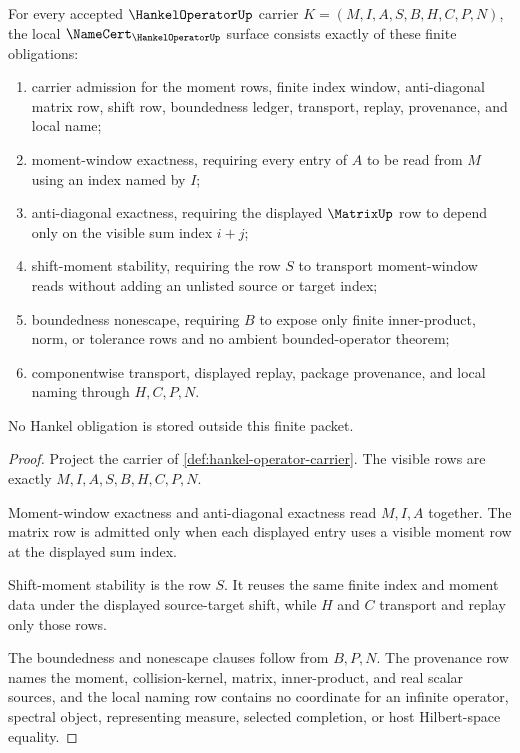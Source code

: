 \begin{theorem}
\label{thm:hankel-operator-namecert-obligations}
For every accepted $\HankelOperatorUp$ carrier $K=(M,I,A,S,B,H,C,P,N)$, the local $\NameCert_{\HankelOperatorUp}$ surface consists exactly of these finite obligations:
\begin{enumerate}
\item carrier admission for the moment rows, finite index window, anti-diagonal matrix row, shift row, boundedness ledger, transport, replay, provenance, and local name;
\item moment-window exactness, requiring every entry of $A$ to be read from $M$ using an index named by $I$;
\item anti-diagonal exactness, requiring the displayed $\MatrixUp$ row to depend only on the visible sum index $i+j$;
\item shift-moment stability, requiring the row $S$ to transport moment-window reads without adding an unlisted source or target index;
\item boundedness nonescape, requiring $B$ to expose only finite inner-product, norm, or tolerance rows and no ambient bounded-operator theorem;
\item componentwise transport, displayed replay, package provenance, and local naming through $H,C,P,N$.
\end{enumerate}
No Hankel obligation is stored outside this finite packet.
\end{theorem}
\begin{proof}
Project the carrier of \autoref{def:hankel-operator-carrier}. The visible rows are exactly $M,I,A,S,B,H,C,P,N$.

Moment-window exactness and anti-diagonal exactness read $M,I,A$ together. The matrix row is admitted only when each displayed entry uses a visible moment row at the displayed sum index.

Shift-moment stability is the row $S$. It reuses the same finite index and moment data under the displayed source-target shift, while $H$ and $C$ transport and replay only those rows.

The boundedness and nonescape clauses follow from $B,P,N$. The provenance row names the moment, collision-kernel, matrix, inner-product, and real scalar sources, and the local naming row contains no coordinate for an infinite operator, spectral object, representing measure, selected completion, or host Hilbert-space equality.
\end{proof}

